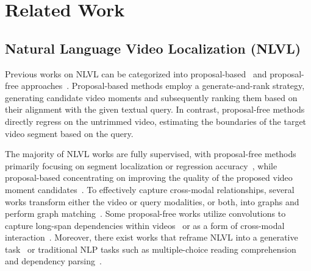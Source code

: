 \section{Related Work}
\label{relatedWorks}
\subsection{Natural Language Video Localization (NLVL)}
Previous works on NLVL can be categorized into proposal-based~\cite{liu_exploring_2022, gao_relation-aware_2021, soldan_vlg-net_2021, xiao_boundary_2021, yang_deconfounded_2021, gao_fast_2021, yu_intra-_2020, wu_learning_2022} and proposal-free approaches~\cite{rodriguez_proposal-free_2020, chen_hierarchical_2020, mun_local-global_2020, zeng_multi-modal_2021, zhao_cascaded_2021, zhang_natural_2022, rodriguez-opazo_dori_2021}. Proposal-based methods employ a generate-and-rank strategy, \ie generating candidate video moments and subsequently ranking them based on their alignment with the given textual query. In contrast, proposal-free methods directly regress on the untrimmed video, estimating the boundaries of the target video segment based on the query.

The majority of NLVL works are fully supervised, with proposal-free methods primarily focusing on segment localization or regression accuracy~\cite{zeng_dense_2020, wang_temporally_2020, rodriguez-opazo_dori_2021}, while proposal-based concentrating on improving the quality of the proposed video moment candidates~\cite{xiao_boundary_2021}. To effectively capture cross-modal relationships, several works transform either the video or query modalities, or both, into graphs and perform graph matching~\cite{soldan_vlg-net_2021, rodriguez-opazo_dori_2021, zeng_multi-modal_2021, chen_hierarchical_2020}. Some proposal-free works utilize convolutions to capture long-span dependencies within videos~\cite{li_proposal-free_2021} or as a form of cross-modal interaction~\cite{zhang_natural_2022, chen_hierarchical_2020}. Moreover, there exist works that reframe NLVL into a generative task~\cite{li2023momentdiff} or traditional NLP tasks such as multiple-choice reading comprehension~\cite{gao_relation-aware_2021} and dependency parsing~\cite{liu_context-aware_2021}. 

